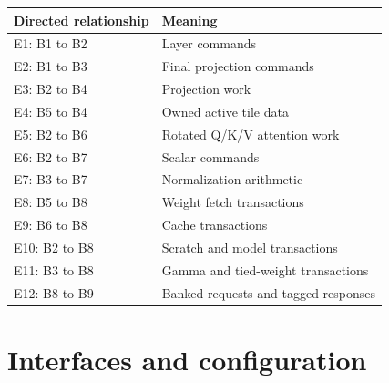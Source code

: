 \documentclass[11pt,a4paper]{article}
\begin{document}
{\small\renewcommand{\arraystretch}{1.18}\begin{longtable}{@{}L{0.24\textwidth}|L{0.7\textwidth}@{}}\toprule

\textbf{Directed relationship} & \textbf{Meaning}\\\midrule\endhead

E1: B1 to B2 & Layer commands\\[2pt]\hline

E2: B1 to B3 & Final projection commands\\[2pt]\hline

E3: B2 to B4 & Projection work\\[2pt]\hline

E4: B5 to B4 & Owned active tile data\\[2pt]\hline

E5: B2 to B6 & Rotated Q/\allowbreak{}K/\allowbreak{}V attention work\\[2pt]\hline

E6: B2 to B7 & Scalar commands\\[2pt]\hline

E7: B3 to B7 & Normalization arithmetic\\[2pt]\hline

E8: B5 to B8 & Weight fetch transactions\\[2pt]\hline

E9: B6 to B8 & Cache transactions\\[2pt]\hline

E10: B2 to B8 & Scratch and model transactions\\[2pt]\hline

E11: B3 to B8 & Gamma and tied-weight transactions\\[2pt]\hline

E12: B8 to B9 & Banked requests and tagged responses\\[2pt]\hline

\bottomrule\end{longtable}}

\section{Interfaces and configuration}
\end{document}
